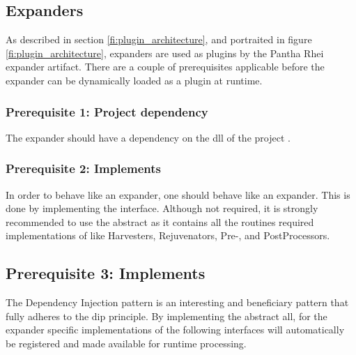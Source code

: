\subsection{Expanders} \label{subsec:expanders}

As described in section \ref{fi:plugin_architecture}, and portraited in figure
\ref{fi:plugin_architecture}, expanders are used as plugins by the Pantha Rhei expander
artifact. There are a couple of prerequisites applicable before the expander can be
dynamically loaded as a plugin at runtime.

\subsubsection*{Prerequisite 1: Project dependency}
The expander should have a dependency on the \gls{dll} of the project
.

\subsubsection*{Prerequisite 2: Implements } In order
to behave like an expander, one should behave like an expander. This is done by
implementing the  interface. Although not
required, it is strongly recommended to use the abstract
 as it contains all the routines required
implementations of  like Harvesters,
Rejuvenators, Pre-, and PostProcessors.

\subsection*{Prerequisite 3: Implements
}
The Dependency Injection pattern is an interesting and beneficiary pattern that fully
adheres to the \gls{dip} principle. By implementing the abstract
 all, for the expander
specific implementations of the following interfaces will automatically be registered and
made available for runtime processing.

